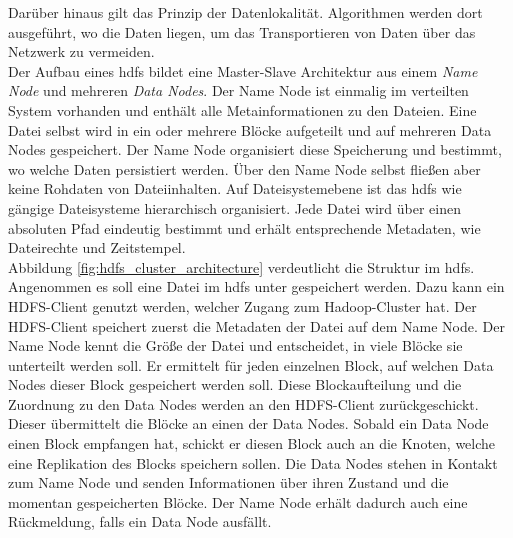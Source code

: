 \noindent
Darüber hinaus gilt das Prinzip der Datenlokalität. Algorithmen werden dort ausgeführt, wo die Daten liegen, um das Transportieren von Daten über das Netzwerk zu vermeiden.\cite{hdfs_architecture}\\

\noindent
Der Aufbau eines \gls{hdfs} bildet eine Master-Slave Architektur aus einem \textit{Name Node} und mehreren \textit{Data Nodes}. Der Name Node ist einmalig im verteilten System vorhanden und enthält alle Metainformationen zu den Dateien. Eine Datei selbst wird in ein oder mehrere Blöcke aufgeteilt und auf mehreren Data Nodes gespeichert. Der Name Node organisiert diese Speicherung und bestimmt, wo welche Daten persistiert werden. Über den Name Node selbst fließen aber keine Rohdaten von Dateiinhalten. Auf Dateisystemebene ist das \gls{hdfs} wie gängige Dateisysteme hierarchisch organisiert. Jede Datei wird über einen absoluten Pfad eindeutig bestimmt und erhält entsprechende Metadaten, wie Dateirechte und Zeitstempel.  \\

\noindent
Abbildung \ref{fig:hdfs_cluster_architecture} verdeutlicht die Struktur im \gls{hdfs}. Angenommen es soll eine Datei im \gls{hdfs} unter  gespeichert werden. Dazu kann ein HDFS-Client genutzt werden, welcher Zugang zum Hadoop-Cluster hat. Der HDFS-Client speichert zuerst die Metadaten der Datei auf dem Name Node. Der Name Node kennt die Größe der Datei und entscheidet, in viele Blöcke sie unterteilt werden soll. Er ermittelt für jeden einzelnen Block, auf welchen Data Nodes dieser Block gespeichert werden soll. Diese Blockaufteilung und die Zuordnung zu den Data Nodes werden an den HDFS-Client zurückgeschickt. Dieser übermittelt die Blöcke an einen der Data Nodes. Sobald ein Data Node einen Block empfangen hat, schickt er diesen Block auch an die Knoten, welche eine Replikation des Blocks speichern sollen. Die Data Nodes stehen in Kontakt zum Name Node und senden Informationen über ihren Zustand und die momentan gespeicherten Blöcke. Der Name Node erhält dadurch auch eine Rückmeldung, falls ein Data Node ausfällt.

